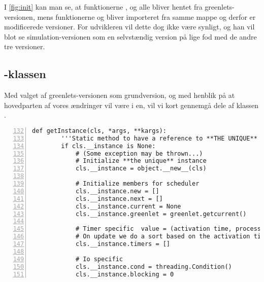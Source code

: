 I \cref{fig:init} kan man se, at funktionerne ,  og  alle bliver hentet fra greenlets-versionen, mens funktionerne  og  bliver importeret fra samme mappe og derfor er modificerede versioner. For udvikleren  vil dette dog ikke være synligt, og han vil blot se simulation-versionen som en selvstændig version på lige fod med de andre tre versioner.

\subsection{-klassen}
\label{sec:scheduler}
Med valget af greenlets-versionen som grundversion, og med henblik på at hovedparten af vores ændringer vil være i \sched en, vil vi kort gennemgå dele af klassen .

\begin{lstlisting}[firstnumber=132,stepnumber=5,numbers=left, float, label=fig:scheduling, caption=Uddrag af Scheduler.py i \code{greenlets}versionen.]
    def getInstance(cls, *args, **kargs):
        '''Static method to have a reference to **THE UNIQUE** instance'''
        if cls.__instance is None:
            # (Some exception may be thrown...)
            # Initialize **the unique** instance
            cls.__instance = object.__new__(cls)

            # Initialize members for scheduler
            cls.__instance.new = []
            cls.__instance.next = []
            cls.__instance.current = None
            cls.__instance.greenlet = greenlet.getcurrent()

            # Timer specific  value = (activation time, process)
            # On update we do a sort based on the activation time
            cls.__instance.timers = []

            # Io specific
            cls.__instance.cond = threading.Condition()
            cls.__instance.blocking = 0
\end{lstlisting}

